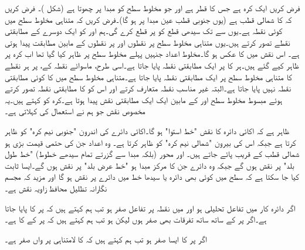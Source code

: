 فرض کریں  ایک کرہ ہے جس کا قطر  ہے اور جو مخلوط سطح کو مبدا پر چھوتا ہے (شکل )۔ فرض کریں کہ  کا شمالی قطب   ہے (یوں جنوبی قطب عین مبدا پر ہو گا)۔فرض کریں کہ متناہی مخلوط سطح میں  کوئی نقطہ ہے۔یوں  سے  تک سیدھی قطع  کو  پر قطع کرے گی۔ہم  اور  کو ایک دوسرے کے مطابقتی نقطے تصور کرتے ہیں۔یوں متناہی مخلوط سطح پر نقطوں اور  پر نقطوں کے مابین مطابقت پیدا ہوتی ہے۔ اس نقش میں  کا عکس  ہو گا۔مخلوط اعداد جنہیں پہلے مخلوط سطح پر ظاہر کیا گیا تھا اب کرہ پر ظاہر کیے گئے ہیں۔ہر  کا  پر ایک مطابقتی نقطہ پایا جاتا ہے۔اسی طرح، ماسوائے نقطہ  کے،  پر ہر نقطے کا متناہی مخلوط سطح پر ایک مطابقتی نقطہ پایا جاتا ہے۔متناہی مخلوط سطح میں  کا کوئی مطابقتی نقطہ نہیں پایا جاتا ہے۔البتہ غیر مناسب نقطہ  متعارف کرتے اور اس کو  کا مطابقتی نقطہ تصور کرتے ہوئے مبسوط مخلوط سطح اور  کے مابین ایک ایک مطابقتی نقش پیدا ہوتا ہے۔کرہ  کو  کہتے ہیں۔یہ مخصوص نقش جو ہم نے استعمال کی  کہلاتی ہے۔

ظاہر  ہے کہ اکائی دائرہ  کا نقش "خط استوا" ہو گا۔اکائی دائرے کی اندرون "جنوبی نیم کرہ" کو ظاہر کرتا ہے جبکہ اس کی بیرون "شمالی نیم کرہ" کو ظاہر کرتا ہے۔ وہ اعداد جن کی حتمی قیمت بڑی ہو شمالی قطب  کے قریب پائے جاتے ہیں۔ اور  محور (بلکہ مبدا سے گزرتے تمام سیدھے خطوط) "خط طول بلد" پر نقش ہوں گے جبکہ وہ دائرے جن کا مرکز مبدا ہو "خط عرض بلد" پر نقش ہوں گے۔ایسا ثابت کیا جا سکتا ہے کہ  سطح میں کوئی بھی دائرہ یا سیدھا خط   میں دائرے پر نقش ہو گا اور مزید کہ مجسم نگارانہ تظلیل  محافظ زاویہ نقش ہے۔

اگر دائرہ کار  میں تفاعل  تحلیلی ہو اور  میں نقطہ  پر تفاعل صفر ہو تب ہم کہتے ہیں کہ  پر  کا  پایا جاتا ہے۔اگر  پر   کے ساتھ ساتھ تفرقات  بھی صفر ہوں لیکن   ہو تب ہم کہتے ہیں کہ   پر  کے  کا     ہے۔

اگر  پر  کا ایسا صفر ہو تب ہم کہتے ہیں کہ  کا لامتناہی پر  واں صفر ہے۔

